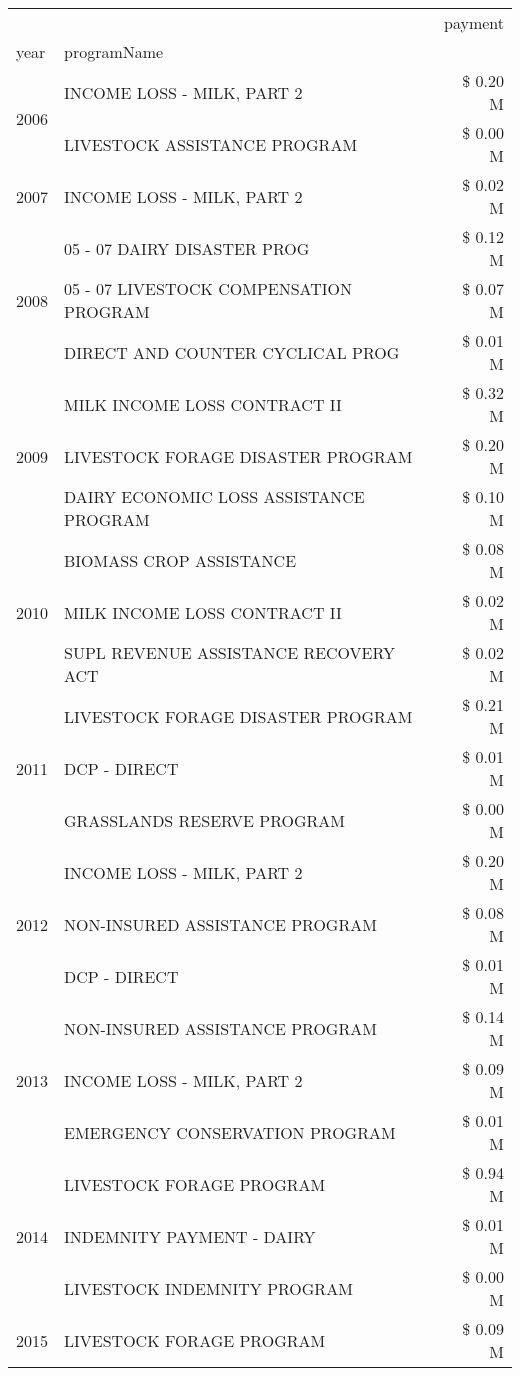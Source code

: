 \begin{tabular}{llr}
\toprule
 &  & payment \\
year & programName &  \\
\midrule
\multirow[t]{2}{*}{2006} & INCOME LOSS - MILK, PART 2 & \$ 0.20 M \\
 & LIVESTOCK ASSISTANCE PROGRAM & \$ 0.00 M \\
\cline{1-3}
2007 & INCOME LOSS - MILK, PART 2 & \$ 0.02 M \\
\cline{1-3}
\multirow[t]{3}{*}{2008} & 05 - 07 DAIRY DISASTER PROG & \$ 0.12 M \\
 & 05 - 07 LIVESTOCK COMPENSATION PROGRAM & \$ 0.07 M \\
 & DIRECT AND COUNTER CYCLICAL PROG & \$ 0.01 M \\
\cline{1-3}
\multirow[t]{3}{*}{2009} & MILK INCOME LOSS CONTRACT II & \$ 0.32 M \\
 & LIVESTOCK FORAGE DISASTER  PROGRAM & \$ 0.20 M \\
 & DAIRY ECONOMIC LOSS ASSISTANCE PROGRAM & \$ 0.10 M \\
\cline{1-3}
\multirow[t]{3}{*}{2010} & BIOMASS CROP ASSISTANCE & \$ 0.08 M \\
 & MILK INCOME LOSS CONTRACT II & \$ 0.02 M \\
 & SUPL REVENUE ASSISTANCE RECOVERY ACT & \$ 0.02 M \\
\cline{1-3}
\multirow[t]{3}{*}{2011} & LIVESTOCK FORAGE DISASTER PROGRAM & \$ 0.21 M \\
 & DCP - DIRECT & \$ 0.01 M \\
 & GRASSLANDS RESERVE PROGRAM & \$ 0.00 M \\
\cline{1-3}
\multirow[t]{3}{*}{2012} & INCOME LOSS - MILK, PART 2 & \$ 0.20 M \\
 & NON-INSURED ASSISTANCE PROGRAM & \$ 0.08 M \\
 & DCP - DIRECT & \$ 0.01 M \\
\cline{1-3}
\multirow[t]{3}{*}{2013} & NON-INSURED ASSISTANCE PROGRAM & \$ 0.14 M \\
 & INCOME LOSS - MILK, PART 2 & \$ 0.09 M \\
 & EMERGENCY CONSERVATION PROGRAM & \$ 0.01 M \\
\cline{1-3}
\multirow[t]{3}{*}{2014} & LIVESTOCK FORAGE PROGRAM & \$ 0.94 M \\
 & INDEMNITY PAYMENT - DAIRY & \$ 0.01 M \\
 & LIVESTOCK INDEMNITY PROGRAM & \$ 0.00 M \\
\cline{1-3}
\multirow[t]{3}{*}{2015} & LIVESTOCK FORAGE PROGRAM & \$ 0.09 M \\

\end{tabular}
